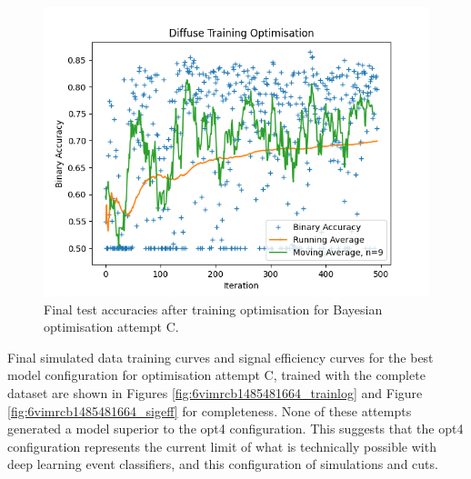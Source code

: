 \begin{figure}[h] 
        \centering \includegraphics[width=\columnwidth]{figures/convplot_longmoredata.png}

        \caption{
                \label{fig:convplot_longmoredata} Final test accuracies after training optimisation for Bayesian optimisation attempt C.
        }
\end{figure}

Final simulated data training curves and signal efficiency curves for the best model configuration for optimisation attempt C, trained with the complete dataset are shown in Figures \ref{fig:6vimrcb1485481664_trainlog} and Figure \ref{fig:6vimrcb1485481664_sigeff} for completeness. None of these attempts generated a model superior to the opt4 configuration. This suggests that the opt4 configuration represents the current limit of what is technically possible with deep learning event classifiers, and this configuration of simulations and cuts.

